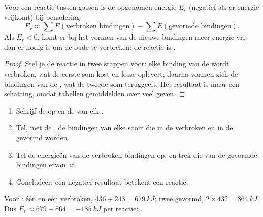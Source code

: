 \begin{proposition}\label{prop:g11:reaction-energy:estimate}
Voor een reactie tussen gassen is de opgenomen energie $E_r$ (negatief
als er energie vrijkomt) bij benadering
\[
  E_r \approx \sum E(\text{verbroken bindingen}) - \sum E(\text{gevormde bindingen}) .
\]
Als $E_r < 0$, komt er bij het vormen van de nieuwe bindingen meer
energie vrij dan er nodig is om de oude te verbreken: de reactie is
.
\end{proposition}

\begin{proof}
Stel je de reactie in twee stappen voor: elke binding van de
 wordt verbroken, wat de eerste som kost en losse 
oplevert; daarna vormen zich de bindingen van de , wat
de tweede som teruggeeft. Het resultaat is maar een schatting, omdat
tabellen gemiddelden over veel  geven.
\end{proof}

\begin{method}\label{met:g11:reaction-energy:bonds}
\begin{enumerate}
  \item Schrijf de  op en de 
        van elk .
  \item Tel, met de , de bindingen van elke soort die in de
         verbroken en in de  gevormd worden.
  \item Tel de energieën van de verbroken bindingen op, en trek die van
        de gevormde bindingen ervan af.
  \item Concludeer: een negatief resultaat betekent een 
        reactie.
\end{enumerate}
\end{method}

\begin{example}\label{ex:g11:reaction-energy:hcl}
Voor : één  en één  verbroken,
$436 + 243 = \qty{679}{kJ}$; twee  gevormd, $2 \times 432 =
\qty{864}{kJ}$. Dus $E_r \approx 679 - 864 = \qty{-185}{kJ}$ per 
reactie: .
\end{example}


